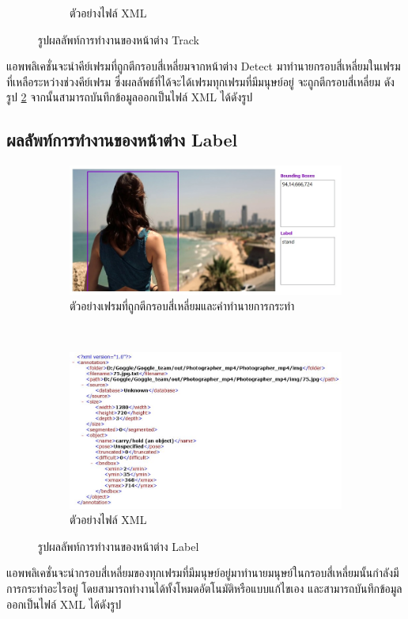 \begin{figure}[!ht]
\begin{subfigure}[b]{0.7\linewidth}
      \caption{ตัวอย่างไฟล์ XML}
    \end{subfigure}
    \caption{รูปผลลัพท์การทำงานของหน้าต่าง Track}
    \label{fig:result_track}
  \end{figure}
แอพพลิเคชั่นจะนำคีย์เฟรมที่ถูกตีกรอบสี่เหลี่ยมจากหน้าต่าง Detect มาทำนายกรอบสี่เหลี่ยมในเฟรมที่เหลือระหว่างช่วงคีย์เฟรม ซึ่งผลลัพธ์ที่ได้จะได้เฟรมทุกเฟรมที่มีมนุษย์อยู่ จะถูกตีกรอบสี่เหลี่ยม ดังรูป \ref{fig:result_track} จากนั้นสามารถบันทึกข้อมูลออกเป็นไฟล์ XML ได้ดังรูป

\clearpage
\subsection*{ผลลัพท์การทำงานของหน้าต่าง Label}
\begin{figure}[!ht]
    \centering
   \begin{subfigure}[b]{0.65\linewidth}
      \includegraphics[width=\linewidth]{chapter4/images/Result/result_select.jpg}
      \caption{ตัวอย่างเฟรมที่ถูกตีกรอบสี่เหลี่ยมและคำทำนายการกระทำ}
    \end{subfigure}
\\
    \begin{subfigure}[b]{0.8\linewidth}
      \includegraphics[width=\linewidth]{chapter4/images/Result/result_select9.jpg}
      \caption{ตัวอย่างไฟล์ XML}
    \end{subfigure}
    \caption{รูปผลลัพท์การทำงานของหน้าต่าง Label}
    \label{fig:result_track}
  \end{figure}
แอพพลิเคชั่นจะนำกรอบสี่เหลี่ยมของทุกเฟรมที่มีมนุษย์อยู่มาทำนายมนุษย์ในกรอบสี่เหลี่ยมนั้นกำลังมีการกระทำอะไรอยู่ โดยสามารถทำงานได้ทั้งโหมดอัตโนมัติหรือแบบแก้ไขเอง และสามารถบันทึกข้อมูลออกเป็นไฟล์ XML ได้ดังรูป
